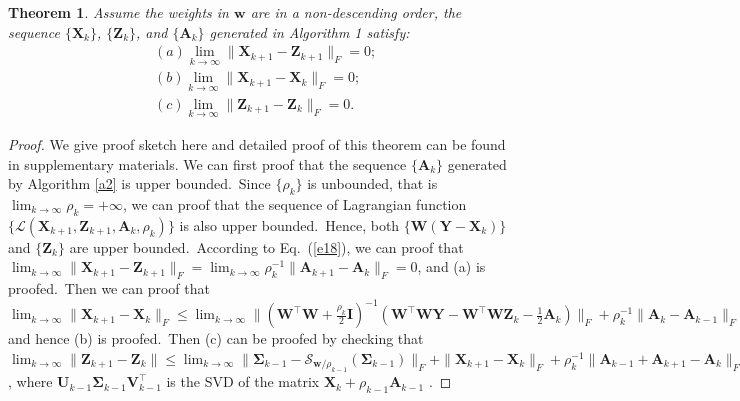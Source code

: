 \documentclass[10pt,twocolumn,letterpaper,sort&compress]{article}
\newtheorem{theorem}{Theorem}
\begin{document}
\begin{theorem}
\label{t1}
Assume the weights in $\bm{w}$ are in a non-descending order, the sequence $\{\mathbf{X}_{k}\}$, $\{\mathbf{Z}_{k}\}$, and $\{\mathbf{A}_{k}\}$ generated in Algorithm 1 satisfy:
\vspace{-3mm}
\begin{align}
&(a) \lim_{k \to \infty} \|\mathbf{X}_{k+1}-\mathbf{Z}_{k+1}\|_{F}=0;
\\
&(b) \lim_{k \to \infty} \|\mathbf{X}_{k+1}-\mathbf{X}_{k}\|_{F}=0;
\\
&(c) \lim_{k \to \infty} \|\mathbf{Z}_{k+1}-\mathbf{Z}_{k}\|_{F}=0.
\end{align}
\vspace{-4mm}
\end{theorem}
\begin{proof}
We give proof sketch here and detailed proof of this theorem can be found in supplementary materials. We can first proof that the sequence $\{\mathbf{A}_{k}\}$ generated by Algorithm \ref{a2} is upper bounded.\ Since $\{\rho_{k}\}$ is unbounded, that is $\lim_{k\to\infty}{\rho_{k}}=+\infty$, we can proof that the sequence of Lagrangian function $\{\mathcal{L}(\mathbf{X}_{k+1},\mathbf{Z}_{k+1},\mathbf{A}_{k},\rho_{k})\}$ is also upper bounded.\
Hence, both $\{\mathbf{W}(\mathbf{Y}-\mathbf{X}_{k})\}$ and $\{\mathbf{Z}_{k}\}$ are upper bounded.\ According to Eq.\ (\ref{e18}), we can proof that 
$
\lim_{k \to \infty} 
\|
\mathbf{X}_{k+1}
-
\mathbf{Z}_{k+1}
\|_{F}
=
\lim_{k \to \infty} 
\rho_{k}^{-1}
\|
\mathbf{A}_{k+1}
-
\mathbf{A}_{k}
\|_{F}
=
0
$,
and (a) is proofed.\ Then we can proof that 
$
\lim_{k \to \infty} 
\|
\mathbf{X}_{k+1}
-
\mathbf{X}_{k}
\|_{F}
\le
\lim_{k \to \infty} 
\|
(\mathbf{W}^{\top}\mathbf{W}
+
\frac{\rho_{k}}{2}
\mathbf{I})^{-1}
(\mathbf{W}^{\top}\mathbf{W}\mathbf{Y}
-
\mathbf{W}^{\top}\mathbf{W}\mathbf{Z}_{k}
-
\frac{1}{2}
\mathbf{A}_{k})
\|_{F}
+
\rho_{k}^{-1}\|
\mathbf{A}_{k}-\mathbf{A}_{k-1}
\|_{F}
=
0
$
and hence (b) is proofed.\ Then (c) can be proofed by checking that 
$
\lim_{k \to \infty} \|\mathbf{Z}_{k+1}-\mathbf{Z}_{k}\|
\le
\lim_{k \to \infty} 
\|
\mathbf{\Sigma}_{k-1}-\mathcal{S}_{\bm{w}/\rho_{k-1}}(\mathbf{\Sigma}_{k-1})
\|_{F}
+
\|
\mathbf{X}_{k+1}-\mathbf{X}_{k}
\|_{F}
+
\rho_{k}^{-1}
\|
\mathbf{A}_{k-1}
+
\mathbf{A}_{k+1}
-
\mathbf{A}_{k}
\|_{F}
=
0
$
,
where $\mathbf{U}_{k-1}\mathbf{\Sigma}_{k-1}\mathbf{V}_{k-1}^{\top}$ is the SVD of the matrix $\mathbf{X}_{k}+\rho_{k-1}\mathbf{A}_{k-1}$
.
\end{proof}
\end{document}
